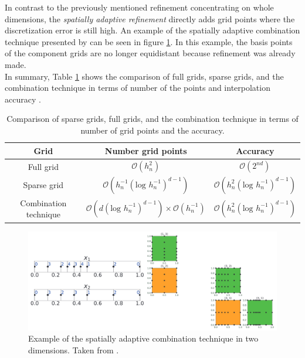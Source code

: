 In contrast to the previously mentioned refinement concentrating on whole dimensions, the \textit{spatially adaptive refinement} directly adds grid points where the discretization error is still high. An example of the spatially adaptive combination technique presented by \cite{obersteiner2021generalized} can be seen in figure \ref{fig:spatially_adaptive_combi_technique}. In this example, the basis points of the component grids are no longer equidistant because refinement was already made. 
\\

In summary, Table \ref{tab:comparison_grids} shows the comparison of full grids, sparse grids, and the combination technique in terms of number of the points and interpolation accuracy \cite{pfluger2010spatially}.


\begin{table}[ht]
	\caption{ Comparison of sparse grids, full grids, and the combination technique in terms of number of grid points and the accuracy. }
	\label{tab:comparison_grids}
	\centering
	\begin{tabular}{|c c c|} 
		\hline
		Grid & Number grid points & Accuracy \\
		\hline
		Full grid & $ \mathcal{O}\left(h_n^2\right) $ & $ \mathcal{O}\left(2^{nd}\right) $ \\
		Sparse grid & $ \mathcal{O}\left(h_n^{-1}\left(\text{log } h_n^{-1}\right)^{d-1}\right) $ & $ \mathcal{O}\left(h_n^{2}\left(\text{log } h_n^{-1}\right)^{d-1}\right) $ \\
		Combination technique & $ \mathcal{O}\left(d\left(\text{log } h_n^{-1}\right)^{d-1}\right) \times  \mathcal{O}\left(h_n^{-1}\right) $ & $ \mathcal{O}\left(h_n^{2}\left(\text{log } h_n^{-1}\right)^{d-1}\right) $\\
		\hline
	\end{tabular}
\end{table}

\begin{figure}[ht]
	\centering
	\includegraphics[scale=0.2]{figures/spatially_adaptive_combi_technique.png}
	\caption{ Example of the spatially adaptive combination technique in two dimensions. Taken from \cite{obersteiner2021generalized}. }
	\label{fig:spatially_adaptive_combi_technique}
\end{figure}

